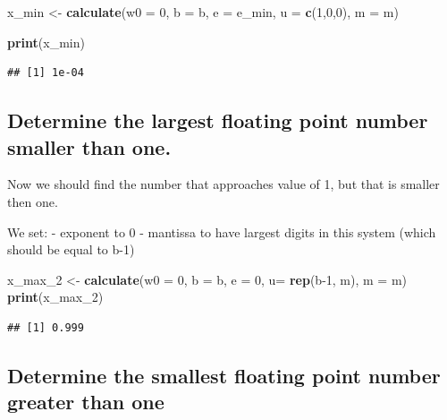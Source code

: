 \documentclass[
]{article}
\newenvironment{Shaded}{\begin{snugshade}}{\end{snugshade}}
\newcommand{\AttributeTok}[1]{\textcolor[rgb]{0.13,0.29,0.53}{#1}}
\newcommand{\DecValTok}[1]{\textcolor[rgb]{0.00,0.00,0.81}{#1}}
\newcommand{\FunctionTok}[1]{\textcolor[rgb]{0.13,0.29,0.53}{\textbf{#1}}}
\newcommand{\NormalTok}[1]{#1}
\newcommand{\OtherTok}[1]{\textcolor[rgb]{0.56,0.35,0.01}{#1}}
\begin{document}
\begin{Shaded}
\begin{Highlighting}[]
\NormalTok{x\_min }\OtherTok{\textless{}{-}} \FunctionTok{calculate}\NormalTok{(}\AttributeTok{w0 =} \DecValTok{0}\NormalTok{, }\AttributeTok{b =}\NormalTok{ b, }\AttributeTok{e =}\NormalTok{ e\_min, }\AttributeTok{u =} \FunctionTok{c}\NormalTok{(}\DecValTok{1}\NormalTok{,}\DecValTok{0}\NormalTok{,}\DecValTok{0}\NormalTok{), }\AttributeTok{m =}\NormalTok{ m)}

\FunctionTok{print}\NormalTok{(x\_min)}
\end{Highlighting}
\end{Shaded}

\begin{verbatim}
## [1] 1e-04
\end{verbatim}

\subsection{Determine the largest floating point number smaller than
one.}\label{determine-the-largest-floating-point-number-smaller-than-one.}

Now we should find the number that approaches value of 1, but that is
smaller then one.

We set: - exponent to 0 - mantissa to have largest digits in this system
(which should be equal to b-1)

\begin{Shaded}
\begin{Highlighting}[]
\NormalTok{x\_max\_2 }\OtherTok{\textless{}{-}} \FunctionTok{calculate}\NormalTok{(}\AttributeTok{w0 =} \DecValTok{0}\NormalTok{, }\AttributeTok{b =}\NormalTok{ b, }\AttributeTok{e =} \DecValTok{0}\NormalTok{, }\AttributeTok{u=} \FunctionTok{rep}\NormalTok{(b}\DecValTok{{-}1}\NormalTok{, m), }\AttributeTok{m =}\NormalTok{ m)}
\FunctionTok{print}\NormalTok{(x\_max\_2)}
\end{Highlighting}
\end{Shaded}

\begin{verbatim}
## [1] 0.999
\end{verbatim}

\subsection{Determine the smallest floating point number greater than
one}\label{determine-the-smallest-floating-point-number-greater-than-one}
\end{document}
